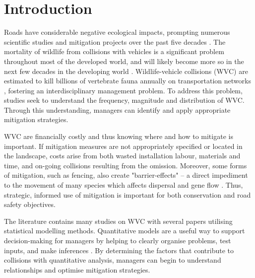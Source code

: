 \section{Introduction}

Roads have considerable negative ecological impacts, prompting numerous scientific studies and mitigation projects over the past five decades \citep{form98,spel98,rvdr15}. The mortality of wildlife from collisions with vehicles is a significant problem throughout most of the developed world, and will likely become more so in the next few decades in the developing world \citep{rvdr15}. Wildlife-vehicle collisions (WVC) are estimated to kill billions of vertebrate fauna annually on transportation networks \citep{seil06}, fostering an interdisciplinary management problem. To address this problem, studies seek to understand the frequency, magnitude and distribution of WVC.  Through this understanding, managers can identify and apply appropriate mitigation strategies.

WVC are financially costly \citep{biss08b,huij09,rowd08} and thus knowing where and how to mitigate is important.  If mitigation measures are not appropriately specified or located in the landscape, costs arise from both wasted installation labour, materials and time, and on-going collisions resulting from the omission.  Moreover, some forms of mitigation, such as fencing, also create "barrier-effects" -- a direct impediment to the movement of many species which affects dispersal and gene flow \citep{epps05}.  Thus, strategic, informed use of mitigation is important for both conservation and road safety objectives.

The literature contains many studies on WVC with several papers utilising statistical modelling methods.  Quantitative models are a useful way to support decision-making for managers by helping to clearly organise problems, test inputs, and make inferences \citep{ande15}.  By determining the factors that contribute to collisions with quantitative analysis, managers can begin to understand relationships and optimise mitigation strategies.

